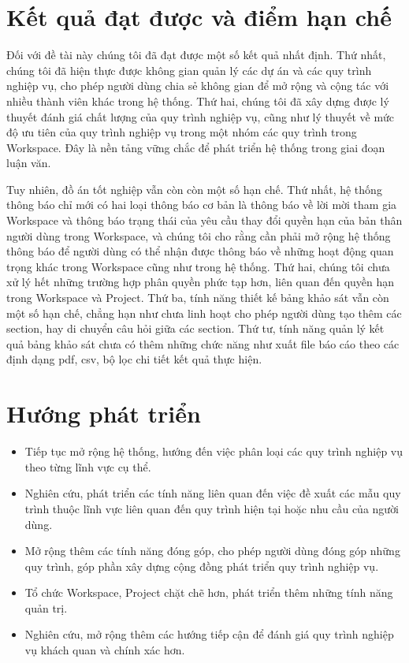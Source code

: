 \section{Kết quả đạt được và điểm hạn chế}
Đối với đề tài này chúng tôi đã đạt được một số kết quả nhất định.
Thứ nhất, chúng tôi đã hiện thực được không gian quản lý các dự án và các quy trình nghiệp vụ, cho phép người dùng chia sẻ không gian 
để mở rộng và cộng tác với nhiều thành viên khác trong hệ thống. Thứ hai, chúng tôi đã xây dựng được lý thuyết đánh giá chất lượng của quy
trình nghiệp vụ, cũng như lý thuyết về mức độ ưu tiên của quy trình nghiệp vụ trong một nhóm các quy trình trong Workspace. Đây là nền tảng
vững chắc để phát triển hệ thống trong giai đoạn luận văn.
\par
Tuy nhiên, đồ án tốt nghiệp vẫn còn còn một số hạn chế. Thứ nhất, hệ thống thông báo chỉ mới có hai loại thông báo cơ bản 
là thông báo về lời mời tham gia Workspace và thông báo trạng thái của yêu cầu thay đổi quyền hạn của bản thân người dùng 
trong Workspace, và chúng tôi cho rằng cần phải mở rộng hệ thống thông báo để người dùng có thể nhận được thông báo về những 
hoạt động quan trọng khác trong Workspace cũng như trong hệ thống. Thứ hai, chúng tôi chưa xử lý hết những trường hợp 
phân quyền phức tạp hơn, liên quan đến quyền hạn trong Workspace và Project. Thứ ba, tính năng thiết kế bảng khảo sát 
vẫn còn một số hạn chế, chẳng hạn như chưa linh hoạt cho phép người dùng tạo thêm các section, hay di chuyển câu hỏi 
giữa các section. Thứ tư, tính năng quản lý kết quả bảng khảo sát chưa có thêm những chức năng như xuất file báo cáo 
theo các định dạng pdf, csv, bộ lọc chi tiết kết quả thực hiện.

\section{Hướng phát triển}
\begin{itemize}
    \item Tiếp tục mở rộng hệ thống, hướng đến việc phân loại các quy trình nghiệp vụ theo từng lĩnh vực cụ thể.
    \item Nghiên cứu, phát triển các tính năng liên quan đến việc đề xuất các mẫu quy trình thuộc lĩnh vực liên quan đến quy trình hiện tại hoặc nhu cầu của người dùng.
    \item Mở rộng thêm các tính năng đóng góp, cho phép người dùng đóng góp những quy trình, góp phần xây dựng cộng đồng phát triển quy trình nghiệp vụ.
    \item Tổ chức Workspace, Project chặt chẽ hơn, phát triển thêm những tính năng quản trị.
    \item Nghiên cứu, mở rộng thêm các hướng tiếp cận để đánh giá quy trình nghiệp vụ khách quan và chính xác hơn.
\end{itemize}

